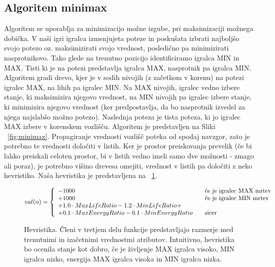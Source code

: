 \documentclass[12pt,a4paper,openany]{book}
\begin{document}
\subsection{Algoritem minimax}
Algoritem se uporablja za minimizacijo možne izgube, pri maksimizaciji možnega dobička. V naši igri igralca izmenjujeta poteze in poskušata izbrati najboljšo svojo potezo oz. maksimizirati svojo vrednost, posledično pa minimizirati nasprotnikovo. Tako glede na trenutno pozicijo identificiramo igralca MIN in MAX. Tisti ki je na potezi predstavlja igralca MAX, nasprotnik pa igralca MIN. Algoritem gradi drevo, kjer je v sodih nivojih (z začetkom v korenu) na potezi igralec MAX, na lihih pa igralec MIN. Na MAX nivojih, igralec vedno izbere stanje, ki maksimizira njegovo vrednost, na MIN nivojih pa igralec izbere stanje, ki minimizira njegovo vrednost (ker predpostavlja, da bo nasprotnik izvedel za njega najslabšo možno potezo). Naslednja poteza je tista poteza, ki jo igralec MAX izbere v korenskem vozlišču. Algoritem je predstavljen na Sliki ~\ref{fig:minimax}. Propagiranje vrednosti vozlišč poteka od spodaj navzgor, zato je potrebno te vrednosti določiti v listih. Ker je prostor preiskovanja prevelik (če bi lahko preiskali celoten prostor, bi v listih vedno imeli samo dve možnosti - zmago ali poraz), je potrebno višino drevesa omejiti, vrednost v listih pa določiti z neko hevristiko. Naša hevristika je predstavljena na ~\ref{eq:hevristika}. 

\begin{figure}[ht]
\centering

\[
  val(n) = \left\{ 
  \begin{array}{l l}
    -1000 & \quad \textrm{če je igralec MAX mrtev}\\
    +1000 & \quad \textrm{če je igralec MIN mrtev}\\
    +1.0\cdot MaxLifeRatio-1.2\cdot MinLifeRatio+ \\+0.1
 \cdot MaxEnergyRatio -0.1\cdot MinEnergyRatio & \quad \textrm{sicer}\\
  \end{array} \right.
\]
\caption[Hevristika]{Hevristika. Členi v tretjem delu funkcije predstavljajo razmerje med trenutnimi in izačetnimi vrednostmi atributov. Intuitivno, hevristika bo ocenila stanje kot dobro, če je življenje MAX igralca visoko, MIN igralca nizko, energija MAX igralca visoka in MIN igralca nizka.}
\label{eq:hevristika}
\end{figure}
\end{document}
